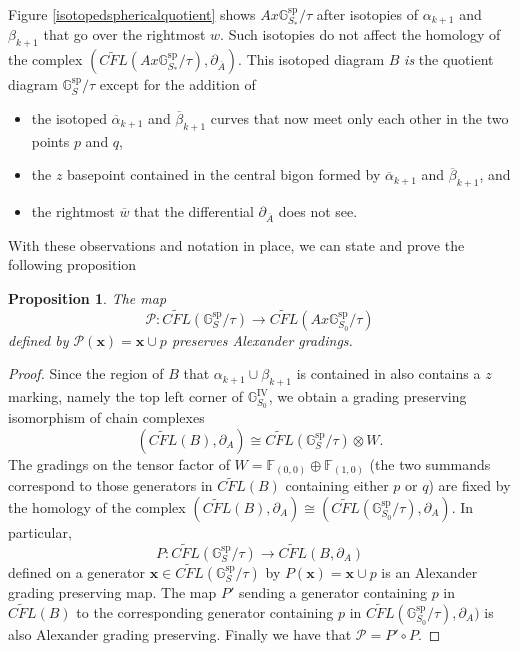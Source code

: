 \documentclass[11pt]{amsart}
\newtheorem{proposition}[theorem]{Proposition}
\theoremstyle{definition}
\theoremstyle{remark}
\def\F{\mathbb{F}}
\numberwithin{equation}{section}
\begin{document}
 
Figure \ref{isotopedsphericalquotient} shows $Ax\mathbb{G}_{S_*}^{\textrm{sp}}/\tau$ after isotopies of $\alpha_{k+1}$ and $\beta_{k+1}$ that go over the rightmost $w$.  Such isotopies do not affect the homology of the complex $(\widetilde{CFL}(Ax\mathbb{G}_{S_*}^{\textrm{sp}}/\tau), \partial_{\overline{A}})$. This isotoped diagram $B$ \emph{is} the quotient diagram $\mathbb{G}_S^{\textrm{sp}}/\tau$ except for the addition of
 \begin{itemize}
     \item the isotoped $\overline{\alpha}_{k+1}$ and $\overline{\beta}_{k+1}$ curves that now meet only each other in the two points $p$ and $q$, 
     \item the $z$ basepoint contained in the central bigon formed by $\overline{\alpha}_{k+1}$ and $\overline{\beta}_{k+1}$, and
     \item the rightmost $\overline{w}$ that the differential $\partial_{\overline{A}}$ does not see.
 \end{itemize}
 With these observations and notation in place, we can state and prove the following proposition
 \begin{proposition}\label{quotientgradingshift}
    The map \[\mathcal{P}\colon  \widetilde{CFL}(\mathbb{G}_S^{\textrm{sp}}/\tau)\to  \widetilde{CFL}(Ax\mathbb{G}_{S_0}^{\textrm{sp}}/\tau)\] defined by $\mathcal{P}(\mathbf{x})=\mathbf{x}\cup p$ preserves Alexander gradings.
\end{proposition}
\begin{proof}
 Since the region of $B$ that $\alpha_{k+1}\cup \beta_{k+1}$ is contained in also contains a $z$ marking, namely the top left corner of $\mathbb{G}_{S_0}^{\textrm{IV}}$, we obtain a grading preserving isomorphism of chain complexes \[(\widetilde{CFL}(B),\partial_{A})\cong \widetilde{CFL}(\mathbb{G}_S^{\textrm{sp}}/\tau)\otimes W.\] The gradings on the tensor factor of $W=\F_{(0,0)}\oplus \F_{(1,0)}$ (the two summands correspond to those generators in $\widetilde{CFL}(B)$ containing either $p$ or $q$) are fixed by the homology of the complex $(\widetilde{CFL}(B),\partial_{A})\cong (\widetilde{CFL}(\mathbb{G}_{S_0}^{\textrm{sp}}/\tau), \partial_{A})$. In particular, 
\[
P\colon \widetilde{CFL}(\mathbb{G}_S^{\textrm{sp}}/\tau)\rightarrow \widetilde{CFL}(B, \partial_{A})\] defined on a generator $\mathbf{x}\in \widetilde{CFL}(\mathbb{G}_S^{\textrm{sp}}/\tau)$ by $P(\mathbf{x})=\mathbf{x}\cup p$ is an Alexander grading preserving map. The map $P'$ sending a generator containing $p$ in $\widetilde{CFL}(B)$ to the corresponding generator containing $p$ in $\widetilde{CFL}(\mathbb{G}_{S_0}^{\textrm{sp}}/\tau), \partial_{A})$ is also Alexander grading preserving. Finally we have that $\mathcal{P}=P'\circ P.$
\end{proof}
\end{document}
